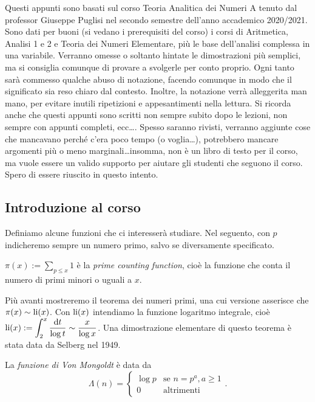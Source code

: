 Questi appunti sono basati sul corso Teoria Analitica dei Numeri A tenuto dal professor Giuseppe Puglisi nel secondo semestre dell'anno accademico 2020/2021. Sono dati per buoni (si vedano i prerequisiti del corso) i corsi di Aritmetica, Analisi 1 e 2 e Teoria dei Numeri Elementare, più le base dell'analisi complessa in una variabile. Verranno omesse o soltanto hintate le dimostrazioni più semplici, ma si consiglia comunque di provare a svolgerle per conto proprio. Ogni tanto sarà commesso qualche abuso di notazione, facendo comunque in modo che il significato sia reso chiaro dal contesto. Inoltre, la notazione verrà alleggerita man mano, per evitare inutili ripetizioni e appesantimenti nella lettura. Si ricorda anche che questi appunti sono scritti non sempre subito dopo le lezioni, non sempre con appunti completi, ecc\dots. Spesso saranno rivisti, verranno aggiunte cose che mancavano perché c'era poco tempo (o voglia\dots), potrebbero mancare argomenti più o meno marginali\dots insomma, non è un libro di testo per il corso, ma vuole essere un valido supporto per aiutare gli studenti che seguono il corso. Spero di essere riuscito in questo intento.

\subsection{Introduzione al corso}

Definiamo alcune funzioni che ci interesserà studiare. Nel seguento, con $p$ indicheremo sempre un numero primo, salvo se diversamente specificato.

\begin{defn}
  $\displaystyle \pi(x):=\sum_{p \le x} 1$ è la \textit{prime counting function}, cioè la funzione che conta il numero di primi minori o uguali a $x$.
\end{defn}

Più avanti mostreremo il teorema dei numeri primi, una cui versione asserisce che $\pi(x) \sim \operatorname{li}(x)$. Con $\operatorname{li}(x)$ intendiamo la funzione logaritmo integrale, cioè $\displaystyle \operatorname{li}(x):=\int_2^x \frac{\mathop{}\!\mathrm{d} t}{\log{t}} \sim \frac{x}{\log{x}}$. Una dimostrazione elementare di questo teorema è stata data da Selberg nel 1949.

\begin{defn}
  La \textit{funzione di Von Mongoldt} è data da $$\Lambda(n)=\begin{cases}
    \log{p} & \mbox{se }n=p^a, a \ge 1 \\ 0 & \mbox{altrimenti}
\end{cases}.$$
\end{defn}

